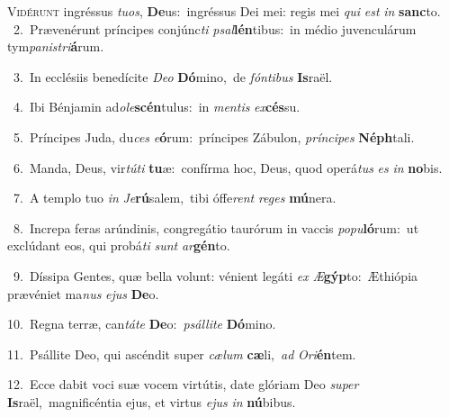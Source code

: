 \lettrine{\initial\textcolor{\initialcolor}{V}}{idérunt} ingréssus \textit{tu}\-\textit{os}, \textbf{De}\-us:~\star ingréssus Dei mei: regis mei \textit{qui} \textit{est} \textit{in} \textbf{sanc}\-to.\\
{\numbfont\textcolor{\numbcolor}{~2.}}~Prævenérunt príncipes conjúnc\textit{ti} \textit{psal}\-\textbf{lén}tibus:~\star in médio juvenculárum tym\-\textit{pa}\-\textit{nis}\textit{tri}\textbf{á}rum.\par
{\numbfont\textcolor{\numbcolor}{~3.}}~In ecclésiis benedícite \textit{De}\-\textit{o} \textbf{Dó}\-mino,~\star de \textit{fón}\-\textit{ti}\textit{bus} \textbf{Is}\-raël.\par
{\numbfont\textcolor{\numbcolor}{~4.}}~Ibi Bénjamin ad\-\textit{o}\-\textit{le}\textbf{scén}tulus:~\star in \textit{men}\-\textit{tis} \textit{ex}\-\textbf{cés}su.\par
{\numbfont\textcolor{\numbcolor}{~5.}}~Príncipes Juda, du\textit{ces} \textit{e}\-\textbf{ó}rum:~\star príncipes Zábulon, \textit{prín}\-\textit{ci}\textit{pes} \textbf{Néph}\-tali.\par
{\numbfont\textcolor{\numbcolor}{~6.}}~Manda, Deus, vir\-\textit{tú}\-\textit{ti} \textbf{tu}\-æ:~\star confírma hoc, Deus, quod operá\textit{tus} \textit{es} \textit{in} \textbf{no}\-bis.\par
{\numbfont\textcolor{\numbcolor}{~7.}}~A templo tuo \textit{in} \textit{Je}\-\textbf{rú}salem,~\star tibi óffe\textit{rent} \textit{re}\-\textit{ges} \textbf{mú}\-nera.\par
{\numbfont\textcolor{\numbcolor}{~8.}}~Increpa feras arúndinis, congregátio taurórum in vaccis \textit{po}\-\textit{pu}\textbf{ló}rum:~\star ut exclúdant eos, qui probá\textit{ti} \textit{sunt} \textit{ar}\-\textbf{gén}to.\par
{\numbfont\textcolor{\numbcolor}{~9.}}~Díssipa Gentes, quæ bella volunt: vénient legáti \textit{ex} \textit{Æ}\-\textbf{gýp}to:~\star Æthiópia prævéniet ma\textit{nus} \textit{e}\-\textit{jus} \textbf{De}\-o.\par
{\numbfont\textcolor{\numbcolor}{10.}}~Regna terræ, can\-\textit{tá}\-\textit{te} \textbf{De}\-o:~\star \textit{psál}\-\textit{li}\textit{te} \textbf{Dó}\-mino.\par
{\numbfont\textcolor{\numbcolor}{11.}}~Psállite Deo, qui ascéndit super \textit{cæ}\-\textit{lum} \textbf{cæ}\-li,~\star \textit{ad} \textit{O}\-\textit{ri}\textbf{én}tem.\par
{\numbfont\textcolor{\numbcolor}{12.}}~Ecce dabit voci suæ vocem virtútis, date glóriam Deo \textit{su}\-\textit{per} \textbf{Is}\-raël,~\star magnificéntia ejus, et virtus \textit{e}\-\textit{jus} \textit{in} \textbf{nú}\-bibus.\par
